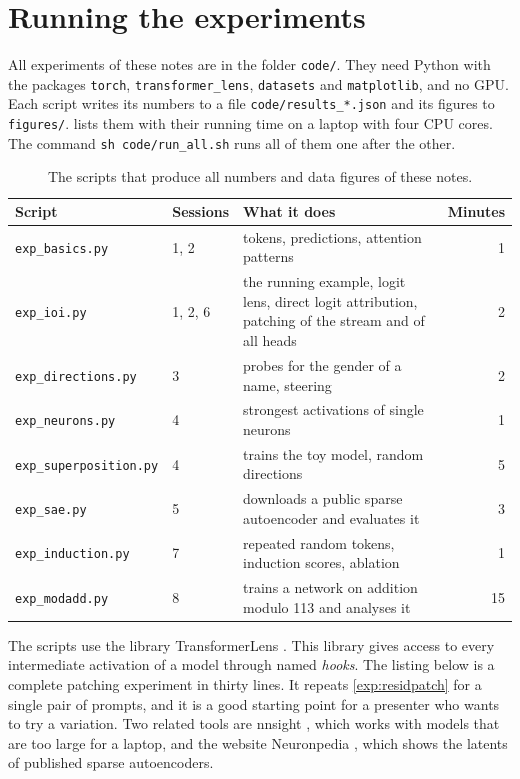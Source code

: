 \section{Running the experiments}
\label{app:scripts}

All experiments of these notes are in the folder \texttt{code/}. They need Python with the packages
\texttt{torch}, \texttt{transformer\_lens}, \texttt{datasets} and \texttt{matplotlib}, and no GPU. Each script
writes its numbers to a file \texttt{code/results\_*.json} and its figures to \texttt{figures/}.
 lists them with their running time on a laptop with four CPU cores. The command
\texttt{sh code/run\_all.sh} runs all of them one after the other.

\begin{table}[h]
\centering\small
\begin{tabular}{@{}llp{}r@{}}
\toprule
Script & Sessions & What it does & Minutes \\
\midrule
\texttt{exp\_basics.py} & 1, 2 & tokens, predictions, attention patterns & 1 \\
\texttt{exp\_ioi.py} & 1, 2, 6 & the running example, logit lens, direct logit attribution, patching of the stream and of all heads & 2 \\
\texttt{exp\_directions.py} & 3 & probes for the gender of a name, steering & 2 \\
\texttt{exp\_neurons.py} & 4 & strongest activations of single neurons & 1 \\
\texttt{exp\_superposition.py} & 4 & trains the toy model, random directions & 5 \\
\texttt{exp\_sae.py} & 5 & downloads a public sparse autoencoder and evaluates it & 3 \\
\texttt{exp\_induction.py} & 7 & repeated random tokens, induction scores, ablation & 1 \\
\texttt{exp\_modadd.py} & 8 & trains a network on addition modulo 113 and analyses it & 15 \\
\bottomrule
\end{tabular}
\caption{The scripts that produce all numbers and data figures of these notes.}
\label{tab:scripts}
\end{table}

The scripts use the library TransformerLens \citep{nanda2022transformerlens}. This library gives access to every
intermediate activation of a model through named \emph{hooks}. The listing below is a complete patching experiment
in thirty lines. It repeats \cref{exp:residpatch} for a single pair of prompts, and it is a good starting point for
a presenter who wants to try a variation. Two related tools are nnsight \citep{fiottokaufman2025nnsight}, which
works with models that are too large for a laptop, and the website Neuronpedia \citep{lin2023neuronpedia}, which
shows the latents of published sparse autoencoders.

